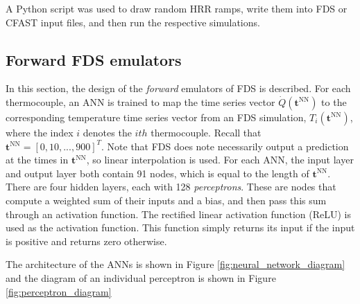 \documentclass{article}
\begin{document}
A Python script was used to draw random HRR ramps, write them into FDS or CFAST input files, and then run the respective simulations. 

\clearpage
\subsection{Forward FDS emulators}
In this section, the design of the \textit{forward} emulators of FDS is described. For each thermocouple, an ANN is trained to map the time series vector $\dot{Q}(\boldsymbol{t}^\text{NN})$ to the corresponding temperature time series vector from an FDS simulation, $T_i(\boldsymbol{t}^\text{NN})$, where the index $i$ denotes the $ith$ thermocouple. Recall that $\boldsymbol{t}^\text{NN} = [0, 10, ..., 900]^T $. Note that FDS does note necessarily output a prediction at the times in $\boldsymbol{t}^\text{NN}$, so linear interpolation is used. For each ANN, the input layer and output layer both contain 91 nodes, which is equal to the length of $\boldsymbol{t}^\text{NN}$. There are four hidden layers, each with 128 \textit{perceptrons}. These are nodes that compute a weighted sum of their inputs and a bias, and then pass this sum through an activation function. The rectified linear activation function (ReLU) is used as the activation function. This function simply returns its input if the input is positive and returns zero otherwise.

The architecture of the ANNs is shown in Figure \ref{fig:neural_network_diagram} and the diagram of an individual perceptron is shown in Figure \ref{fig:perceptron_diagram}
\end{document}
